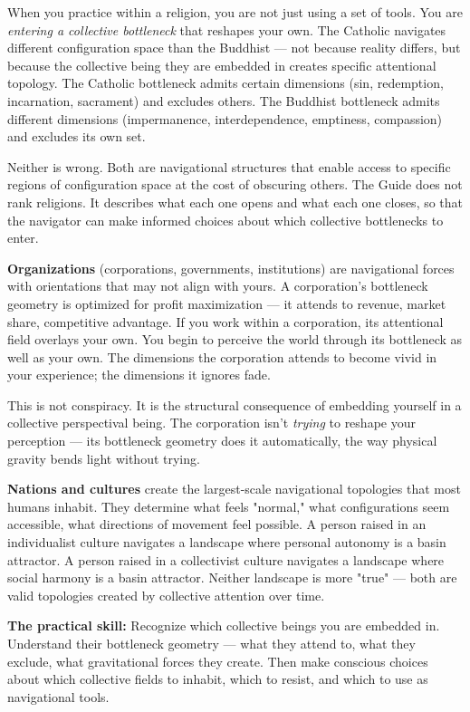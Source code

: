 When you practice within a religion, you are not just using a set of tools. You are \textit{entering a collective bottleneck} that reshapes your own. The Catholic navigates different configuration space than the Buddhist — not because reality differs, but because the collective being they are embedded in creates specific attentional topology. The Catholic bottleneck admits certain dimensions (sin, redemption, incarnation, sacrament) and excludes others. The Buddhist bottleneck admits different dimensions (impermanence, interdependence, emptiness, compassion) and excludes its own set.


Neither is wrong. Both are navigational structures that enable access to specific regions of configuration space at the cost of obscuring others. The Guide does not rank religions. It describes what each one opens and what each one closes, so that the navigator can make informed choices about which collective bottlenecks to enter.


\textbf{Organizations} (corporations, governments, institutions) are navigational forces with orientations that may not align with yours. A corporation's bottleneck geometry is optimized for profit maximization — it attends to revenue, market share, competitive advantage. If you work within a corporation, its attentional field overlays your own. You begin to perceive the world through its bottleneck as well as your own. The dimensions the corporation attends to become vivid in your experience; the dimensions it ignores fade.


This is not conspiracy. It is the structural consequence of embedding yourself in a collective perspectival being. The corporation isn't \textit{trying} to reshape your perception — its bottleneck geometry does it automatically, the way physical gravity bends light without trying.


\textbf{Nations and cultures} create the largest-scale navigational topologies that most humans inhabit. They determine what feels "normal," what configurations seem accessible, what directions of movement feel possible. A person raised in an individualist culture navigates a landscape where personal autonomy is a basin attractor. A person raised in a collectivist culture navigates a landscape where social harmony is a basin attractor. Neither landscape is more "true" — both are valid topologies created by collective attention over time.


\textbf{The practical skill:} Recognize which collective beings you are embedded in. Understand their bottleneck geometry — what they attend to, what they exclude, what gravitational forces they create. Then make conscious choices about which collective fields to inhabit, which to resist, and which to use as navigational tools.


